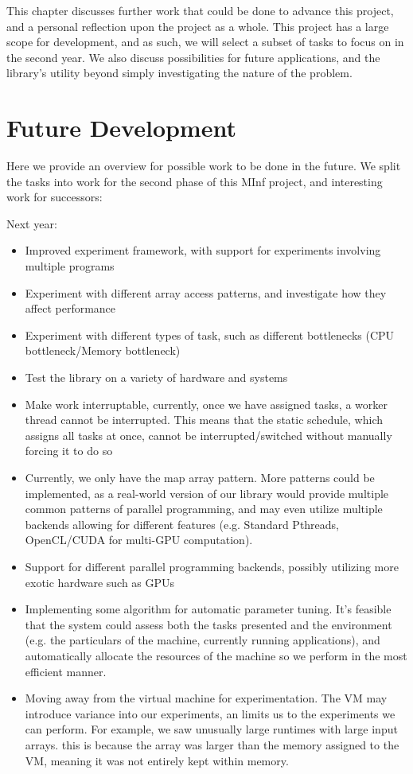 
This chapter discusses further work that could be done to advance this project, and a personal reflection upon the project as a whole. This project has a large scope for development, and as such, we will select a subset of tasks to focus on in the second year. We also discuss possibilities for future applications, and the library's utility beyond simply investigating the nature of the problem.



\section{Future Development}

Here we provide an overview for possible work to be done in the future. We split the tasks into work for the second phase of this MInf project, and interesting work for successors:

Next year:

\begin{itemize}
	\item Improved experiment framework, with support for experiments involving multiple programs
	\item Experiment with different array access patterns, and investigate how they affect performance
	\item Experiment with different types of task, such as different bottlenecks (CPU bottleneck/Memory bottleneck) 
	\item Test the library on a variety of hardware and systems
	\item Make work interruptable, currently, once we have assigned tasks, a worker thread cannot be interrupted. This means that the static schedule, which assigns all tasks at once, cannot be interrupted/switched without manually forcing it to do so
	\item Currently, we only have the map array pattern. More patterns could be implemented, as a real-world version of our library would provide multiple common patterns of parallel programming, and may even utilize multiple backends allowing for different features (e.g. Standard Pthreads, OpenCL/CUDA for multi-GPU computation).
	\item Support for different parallel programming backends, possibly utilizing more exotic hardware such as GPUs 
	\item Implementing some algorithm for automatic parameter tuning. It's feasible that the system could assess both the tasks presented and the environment (e.g. the particulars of the machine, currently running applications), and automatically allocate the resources of the machine so we perform in the most efficient manner.
	\item Moving away from the virtual machine for experimentation. The VM may introduce variance into our experiments, an limits us to the experiments we can perform. For example, we saw unusually large runtimes with large input arrays. this is because the array was larger than the memory assigned to the VM, meaning it was not entirely kept within memory.
\end{itemize}

